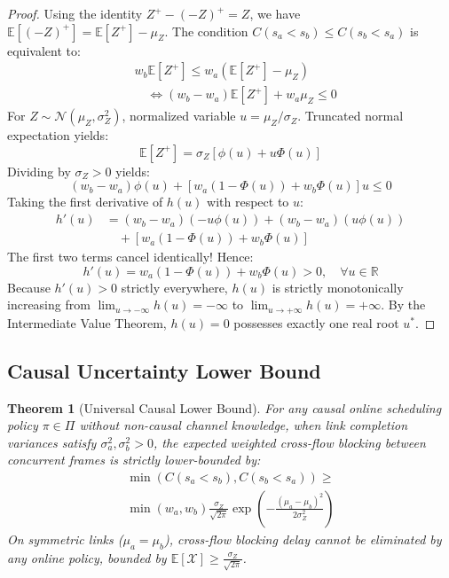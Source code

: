 \documentclass[10pt,journal,compsoc]{IEEEtran}
\newtheorem{theorem}{Theorem}
\begin{document}
\begin{proof}
Using the identity $Z^+ - (-Z)^+ = Z$, we have $\mathbb{E}[(-Z)^+] = \mathbb{E}[Z^+] - \mu_Z$. The condition $C(s_a < s_b) \le C(s_b < s_a)$ is equivalent to:
\begin{align}
    &w_b \mathbb{E}[Z^+] \le w_a \left( \mathbb{E}[Z^+] - \mu_Z \right) \nonumber \\
    &\quad \iff (w_b - w_a) \mathbb{E}[Z^+] + w_a \mu_Z \le 0
\end{align}
For $Z \sim \mathcal{N}(\mu_Z, \sigma_Z^2)$, normalized variable $u = \mu_Z / \sigma_Z$. Truncated normal expectation yields:
\begin{equation}
    \mathbb{E}[Z^+] = \sigma_Z \left[ \phi(u) + u \Phi(u) \right]
\end{equation}
Dividing by $\sigma_Z > 0$ yields:
\begin{equation}
    (w_b - w_a)\phi(u) + \left[w_a(1-\Phi(u)) + w_b\Phi(u)\right]u \le 0
\end{equation}
Taking the first derivative of $h(u)$ with respect to $u$:
\begin{align}
    h'(u) &= (w_b - w_a)(-u\phi(u)) + (w_b - w_a)(u\phi(u)) \nonumber \\
    &\quad + \left[ w_a(1-\Phi(u)) + w_b\Phi(u) \right]
\end{align}
The first two terms cancel identically! Hence:
\begin{equation}
    h'(u) = w_a (1 - \Phi(u)) + w_b \Phi(u) > 0, \quad \forall u \in \mathbb{R}
\end{equation}
Because $h'(u) > 0$ strictly everywhere, $h(u)$ is strictly monotonically increasing from $\lim_{u \to -\infty} h(u) = -\infty$ to $\lim_{u \to +\infty} h(u) = +\infty$. By the Intermediate Value Theorem, $h(u) = 0$ possesses exactly one real root $u^*$.
\end{proof}

\subsection{Causal Uncertainty Lower Bound}

\begin{theorem}[Universal Causal Lower Bound]
\label{thm:lower_bound}
For any causal online scheduling policy $\pi \in \Pi$ without non-causal channel knowledge, when link completion variances satisfy $\sigma_a^2, \sigma_b^2 > 0$, the expected weighted cross-flow blocking between concurrent frames is strictly lower-bounded by:
\begin{multline}
    \min\left( C(s_a < s_b), C(s_b < s_a) \right) \ge \\
    \min(w_a, w_b) \frac{\sigma_Z}{\sqrt{2\pi}} \exp\left( -\frac{(\mu_a - \mu_b)^2}{2\sigma_Z^2} \right)
\end{multline}
On symmetric links ($\mu_a = \mu_b$), cross-flow blocking delay cannot be eliminated by any online policy, bounded by $\mathbb{E}[\mathcal{X}] \ge \frac{\sigma_Z}{\sqrt{2\pi}}$.
\end{theorem}
\end{document}
